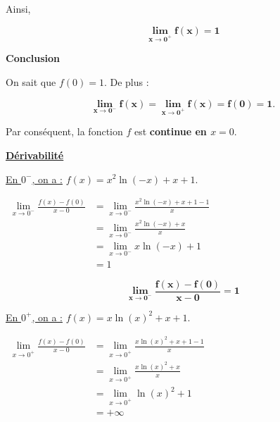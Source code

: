 \documentclass[12pt,a4paper]{article}
\begin{document}
\begin{enumerate}
          Ainsi,

          \begin{resultbox}
              \[
                  \mathbf{\lim\limits_{x \to 0^+} f(x) = 1}
              \]
          \end{resultbox}

          \textbf{  Conclusion }

          On sait que \( f(0) = 1 \). De plus :

          \begin{resultbox}
              \[
                  \mathbf{\lim\limits_{x \to 0^-} f(x) = \lim\limits_{x \to 0^+} f(x) = f(0) = 1.
                  }
              \]
          \end{resultbox}

          Par conséquent, la fonction \( f \) est \textbf{continue en \( x = 0 \)}.

          \underline{\textbf{Dérivabilité}}

          \underline{En \( 0^- \), on a :} \( f(x) = x^2 \ln(-x) + x + 1. \)

          \(
          \begin{aligned}
              \lim\limits_{x \to 0^-}\frac{f(x)-f(0)}{x-0} & =\lim\limits_{x \to 0^-} \frac{x^2 \ln(-x) + x + 1-1}{x} \\
                                                           & =\lim\limits_{x \to 0^-} \frac{x^2 \ln(-x) + x }{x}      \\
                                                           & =\lim\limits_{x \to 0^-} x \ln(-x) + 1                   \\
                                                           & =1
          \end{aligned}
          \)

          \begin{resultbox}
              \[
                  \mathbf{\lim\limits_{x \to 0^-}\frac{f(x)-f(0)}{x-0}=1
                  }
              \]
          \end{resultbox}

          \underline{En \( 0^+ \), on a :} \( f(x) = x \ln(x)^2 + x + 1. \)

          \(
          \begin{aligned}
              \lim\limits_{x \to 0^+}\frac{f(x)-f(0)}{x-0} & =\lim\limits_{x \to 0^+} \frac{x \ln(x)^2 + x + 1-1}{x} \\
                                                           & =\lim\limits_{x \to 0^+} \frac{x \ln(x)^2 + x }{x}      \\
                                                           & =\lim\limits_{x \to 0^+} \ln(x)^2+1                     \\
                                                           & =+\infty
          \end{aligned}
          \)


\end{enumerate}
\end{document}

